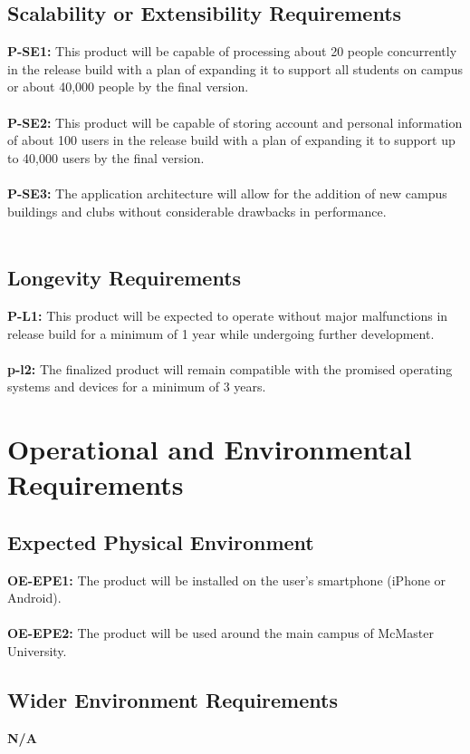 \documentclass[12pt]{article}
\begin{document}
\subsection{Scalability or Extensibility Requirements}
  \textbf{P-SE1:} This product will be capable of processing about 20 people concurrently in the release build with a plan of expanding it to support all students on campus or about 40,000 people by the final version.\\\\
  \textbf{P-SE2:} This product will be capable of storing account and personal information of about 100 users in the release build with a plan of expanding it to support up to 40,000 users by the final version.\\\\
  \textbf{P-SE3:} The application architecture will allow for the addition of new campus buildings and clubs without considerable drawbacks in performance.\\\\
\subsection{Longevity Requirements}
  \textbf{P-L1:} This product will be expected to operate without major malfunctions in release build for a minimum of 1 year while undergoing further development.\\\\
  \textbf{p-l2:} The finalized product will remain compatible with the promised operating systems and devices for a minimum of 3 years.\\

\section{Operational and Environmental Requirements}
\subsection{Expected Physical Environment}
  \textbf{OE-EPE1:} The product will be installed on the user's smartphone (iPhone or Android).\\\\
  \textbf{OE-EPE2:} The product will be used around the main campus of McMaster University.\\
\subsection{Wider Environment Requirements}
  \textbf{N/A}\\
\end{document}
